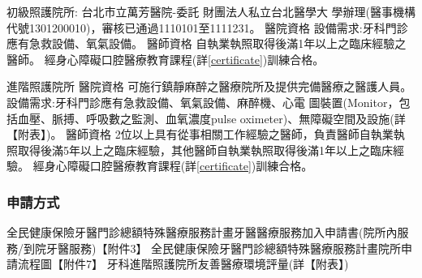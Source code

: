 \begin{outline}

\1 初級照護院所:
台北市立萬芳醫院-委託
財團法人私立台北醫學大
學辦理(醫事機構代號1301200010)，審核已通過1110101至1111231。
\2 醫院資格
    \3 設備需求:牙科門診應有急救設備、氧氣設備。
\2 醫師資格
    \3 %
    自執業執照取得後滿1年以上之臨床經驗之醫師。
    \3 經身心障礙口腔醫療教育課程(詳\ref{certificate})訓練合格。

\1 進階照護院所 %
\2 醫院資格
    \3 可施行鎮靜麻醉之醫療院所及提供完備醫療之醫護人員。
    \3 設備需求:牙科門診應有急救設備、氧氣設備、麻醉機、心電 圖裝置(Monitor，包括血壓、脈搏、呼吸數之監測、血氧濃度pulse oximeter)、無障礙空間及設施(詳【附表】)。
\2 醫師資格
    \3 2位以上具有從事相關工作經驗之醫師，負責醫師自執業執照取得後滿5年以上之臨床經驗，其他醫師自執業執照取得後滿1年以上之臨床經驗。
    \3 經身心障礙口腔醫療教育課程(詳\ref{certificate})訓練合格。
\end{outline}

\subsubsection{申請方式}
\begin{outline}

\1 全民健康保險牙醫門診總額特殊醫療服務計畫牙醫醫療服務加入申請書(院所內服務/到院牙醫服務)【附件3】
\1 全民健康保險牙醫門診總額特殊醫療服務計畫院所申請流程圖【附件7】
\1 牙科進階照護院所友善醫療環境評量(詳【附表】)

\end{outline}


